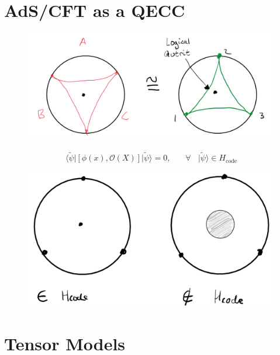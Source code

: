 \documentclass[letter,12pt]{article}
\newcommand{\BO}{\mathcal{O}}
\begin{document}
\section{AdS/CFT as a QECC}
\begin{figure}[H]
	\centering
	\includegraphics[width=0.95\linewidth]{ADS_CFT_Fig5}
	\caption{}
	\label{fig:adscftfig5}
\end{figure}
\begin{equation}
	\begin{aligned}
		\langle \tilde \psi |\left[\phi(x),\BO(X)\right]|\tilde \psi\rangle =0,~~~~~~~~\forall~~~~ |\tilde \psi\rangle\in H_{\text{code}}
	\end{aligned}
\end{equation}
\begin{figure}[]
	\centering
	\includegraphics[width=0.7\linewidth]{ADS_CFT_Fig6}
	\caption{}
	\label{fig:adscftfig6}
\end{figure}
\section{Tensor Models}
\end{document}
